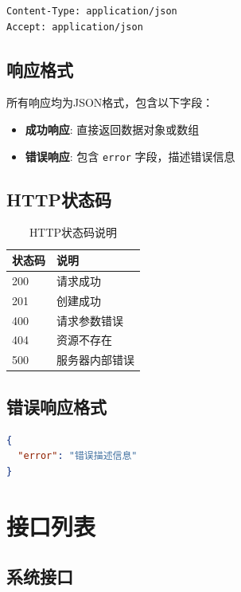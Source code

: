 \documentclass[12pt,a4paper]{article}
\begin{document}
\begin{lstlisting}[language=bash]
Content-Type: application/json
Accept: application/json
\end{lstlisting}

\subsection{响应格式}

所有响应均为JSON格式，包含以下字段：

\begin{itemize}
  \item \textbf{成功响应}: 直接返回数据对象或数组
  \item \textbf{错误响应}: 包含 \texttt{error} 字段，描述错误信息
\end{itemize}

\subsection{HTTP状态码}

\begin{table}[h]
  \centering
  \begin{tabular}{ll}
    \toprule
    状态码 & 说明 \\
    \midrule
    200 & 请求成功 \\
    201 & 创建成功 \\
    400 & 请求参数错误 \\
    404 & 资源不存在 \\
    500 & 服务器内部错误 \\
    \bottomrule
  \end{tabular}
  \caption{HTTP状态码说明}
\end{table}

\subsection{错误响应格式}

\begin{lstlisting}[language=json]
{
  "error": "错误描述信息"
}
\end{lstlisting}

\section{接口列表}

\subsection{系统接口}
\end{document}
